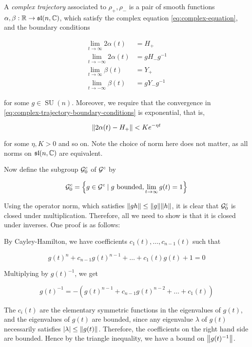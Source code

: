 \documentclass{report}
\DeclareMathOperator{\SU}{SU}
\renewcommand{\sl}{\mathfrak{sl}}
\begin{document}
\begin{definition}
     A \emph{complex trajectory} associated to \(\rho_+, \rho_-\) is a pair of smooth functions \(\alpha, \beta : \R \to \sl(n, \C)\), which satisfy the complex equation \cref{eq:complex-equation}, and the boundary conditions

    \begin{equation}
        \label{eq:complex-trajectory-boundary-conditions}
        \begin{split}
            \lim_{t \to \infty}2\alpha(t) &= H_+ \\
            \lim_{t \to -\infty}2\alpha(t) &= gH_-g^{-1} \\
            \lim_{t \to \infty}\beta(t) &= Y_+ \\
            \lim_{t \to -\infty}\beta(t) &= gY_-g^{-1}
        \end{split}
    \end{equation}

    for some \(g \in \SU(n)\). Moreover, we require that the convergence in \cref{eq:complex-trajectory-boundary-conditions} is exponential, that is,

    \[\norm{2\alpha(t) - H_+} < Ke^{-\eta t}\]

    for some \(\eta, K > 0\) and so on. Note the choice of norm here does not matter, as all norms on \(\sl(n, \C)\) are equivalent.
\end{definition}

Now define the subgroup \(\mathcal{G}^c_0\) of \(\mathcal{G}^c\) by

\[\mathcal{G}^c_0 = \left\{g \in \mathcal{G}^c \mid g \text{ bounded}, \lim_{t \to \infty}g(t) = 1\right\}\]

Using the operator norm, which satisfies \(\norm{gh} \le \norm{g}\norm{h}\), it is clear that \(\mathcal{G}_0^c\) is closed under multiplication. Therefore, all we need to show is that it is closed under inverses. One proof is as follows:

By Cayley-Hamilton, we have coefficients \(c_1(t), \dots, c_{n-1}(t)\) such that

\[g(t)^n + c_{n-1}g(t)^{n-1} + \dots + c_1(t)g(t) + 1 = 0\]

Multiplying by \(g(t)^{-1}\), we get

\[g(t)^{-1} = -\left(g(t)^{n-1} + c_{n-1}g(t)^{n-2} + \dots + c_1(t)\right)\]

The \(c_i(t)\) are the elementary symmetric functions in the eigenvalues of \(g(t)\), and the eigenvalues of \(g(t)\) are bounded, since any eigenvalue \(\lambda\) of \(g(t)\) necessarily satisfies \(\abs{\lambda} \le \norm{g(t)}\). Therefore, the coefficients on the right hand side are bounded. Hence by the triangle inequality, we have a bound on \(\norm{g(t)^{-1}}\).
\end{document}
